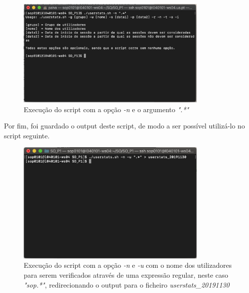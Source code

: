 \documentclass[10pt,portuguese]{article}
\begin{document}
\begin{figure}[!h]
    \centering
    \includegraphics[width=350]{Resultados/usage.png}
    \caption{Execução do script com a opção \textit{-n} e o argumento \textit{".*"}}
\end{figure}

Por fim, foi guardado o output deste script, de modo a ser possível utilizá-lo no script seguinte.
\begin{figure}[!h]
    \centering
    \includegraphics[width=350]{Resultados/save.png}
    \caption{Execução do script com a opção \textit{-n} e \textit{-u} com o nome dos utilizadores para serem verificados através de uma expressão regular, neste caso \textit{"sop.*"}, redirecionando o output para o ficheiro \textit{userstats\_20191130}}
\end{figure}
\clearpage
\end{document}
